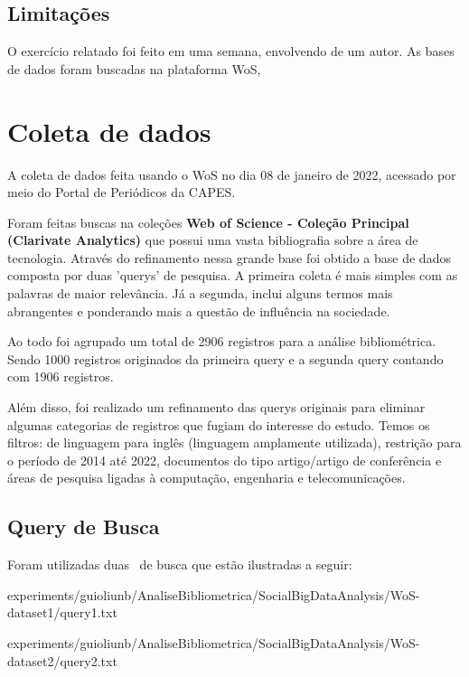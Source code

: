 \subsection{Limitações} O exercício relatado foi feito em uma semana, envolvendo de um autor. As bases de dados foram buscadas na plataforma WoS,


\section{Coleta de dados\label{MASSA:coleta}}

A coleta de dados feita usando o WoS no dia 08 de janeiro de 2022, acessado por meio do Portal de Periódicos da CAPES.

Foram feitas buscas na coleções \textbf{Web of Science - Coleção Principal (Clarivate Analytics) } que possui uma vasta bibliografia sobre a área de tecnologia. Através do refinamento nessa grande base foi obtido a base de dados composta por duas 'querys' de pesquisa. A primeira coleta é mais simples com as palavras de maior relevância. Já a segunda, inclui alguns termos mais abrangentes e ponderando mais a questão de influência na sociedade. 

Ao todo foi agrupado um total de 2906 registros para a análise bibliométrica. Sendo 1000 registros originados da primeira query e a segunda query contando com 1906 registros.

Além disso, foi realizado um refinamento das querys originais para eliminar algumas categorias de registros que fugiam do interesse do estudo. Temos os filtros: de linguagem para inglês (linguagem amplamente utilizada), restrição para o período de 2014 até 2022, documentos do tipo artigo/artigo de conferência e áreas de pesquisa ligadas à computação, engenharia e telecomunicações.

\subsection{Query de Busca}

Foram utilizadas duas \querys\ de busca que estão ilustradas a seguir: %


{experiments/guioliunb/AnaliseBibliometrica/SocialBigDataAnalysis/WoS-dataset1/query1.txt}


{experiments/guioliunb/AnaliseBibliometrica/SocialBigDataAnalysis/WoS-dataset2/query2.txt}

